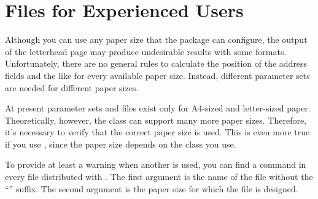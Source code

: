 \section{ Files for Experienced Users}
\BeginIndexGroup
{}

\BeginIndexGroup%
%
Although you can use any paper size that the
\hyperref[cha:typearea]{}%
 package can configure, the output of the letterhead
page may produce undesirable results with some formats. Unfortunately, there
are no general rules to calculate the position of the address fields and the
like for every available paper size. Instead, different parameter sets are
needed for different paper sizes.%


At present parameter sets and  files exist only for A4-sized and
letter-sized paper. Theoretically, however, the  class can
support many more paper sizes. Therefore, it's necessary to verify that the
correct paper size is used. This is even more true if you use
, since the paper size depends on the class you use.

\begin{Declaration}
\end{Declaration}
To provide at least a warning when another  is used, you can
find a  command in every  file
distributed with {\KOMAScript}. The first argument is the name of the
 file without the ``'' suffix. The second argument is the
paper size for which the  file is designed.

